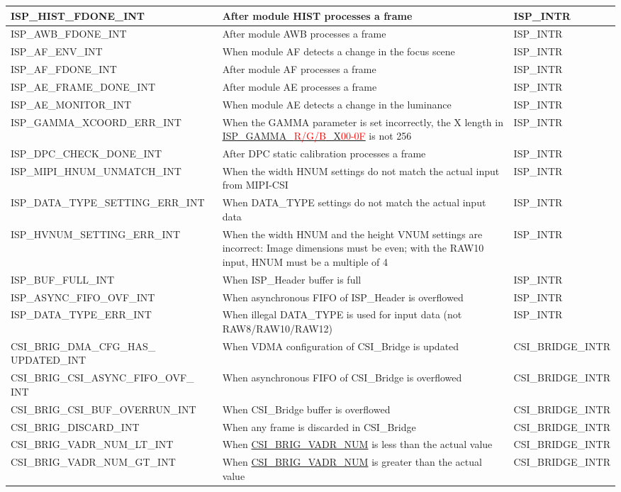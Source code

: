 \documentclass[main\_\_EN.tex]{subfiles}
\begin{document}
\begin{longtable}{ | L{5.5cm} | L{6.5cm} | L{3cm} | }
    ISP\_HIST\_FDONE\_INT & After module HIST processes a frame & ISP\_INTR \\ \hline
    ISP\_AWB\_FDONE\_INT & After module AWB processes a frame & ISP\_INTR \\ \hline
    ISP\_AF\_ENV\_INT & When module AF detects a change in the focus scene & ISP\_INTR \\ \hline
    ISP\_AF\_FDONE\_INT & After module AF processes a frame & ISP\_INTR \\ \hline
    ISP\_AE\_FRAME\_DONE\_INT & After module AE processes a frame & ISP\_INTR \\ \hline
    ISP\_AE\_MONITOR\_INT & When module AE detects a change in the luminance & ISP\_INTR \\ \hline
    ISP\_GAMMA\_XCOORD\_ERR\_INT & When the GAMMA parameter is set incorrectly, the X length in \hyperref[fielddesc:ISPGAMMARX00]{ISP\_GAMMA\_\textcolor{red}{R/G/B}\_X\textcolor{red}{00-0F}} is not 256 & ISP\_INTR \\ \hline
    ISP\_DPC\_CHECK\_DONE\_INT & After DPC static calibration processes a frame & ISP\_INTR \\ \hline
    ISP\_MIPI\_HNUM\_UNMATCH\_INT & When the width HNUM settings do not match the actual input from MIPI-CSI & ISP\_INTR \\ \hline
    ISP\_DATA\_TYPE\_SETTING\_ERR\_INT & When DATA\_TYPE settings do not match the actual input data & ISP\_INTR \\ \hline
    ISP\_HVNUM\_SETTING\_ERR\_INT & When the width HNUM and the height VNUM settings are incorrect: Image dimensions must be even; with the RAW10 input, HNUM must be a multiple of 4 & ISP\_INTR \\ \hline
    ISP\_BUF\_FULL\_INT & When ISP\_Header buffer is full & ISP\_INTR \\ \hline
    ISP\_ASYNC\_FIFO\_OVF\_INT & When asynchronous FIFO of ISP\_Header is overflowed & ISP\_INTR \\ \hline
    ISP\_DATA\_TYPE\_ERR\_INT & When illegal DATA\_TYPE is used for input data (not RAW8/RAW10/RAW12) & ISP\_INTR \\ \hline
    CSI\_BRIG\_DMA\_CFG\_HAS\_          UPDATED\_INT & When VDMA configuration of CSI\_Bridge is updated & CSI\_BRIDGE\_INTR \\\hline
    CSI\_BRIG\_CSI\_ASYNC\_FIFO\_OVF\_  INT & When asynchronous FIFO of CSI\_Bridge is overflowed & CSI\_BRIDGE\_INTR \\\hline
    CSI\_BRIG\_CSI\_BUF\_OVERRUN\_INT & When CSI\_Bridge buffer is overflowed & CSI\_BRIDGE\_INTR \\\hline
    CSI\_BRIG\_DISCARD\_INT & When any frame is discarded in CSI\_Bridge & CSI\_BRIDGE\_INTR \\\hline
    CSI\_BRIG\_VADR\_NUM\_LT\_INT & When \hyperref[fielddesc:CSIBRIGVADRNUM]{CSI\_BRIG\_VADR\_NUM} is less than the actual value & CSI\_BRIDGE\_INTR \\\hline
    CSI\_BRIG\_VADR\_NUM\_GT\_INT & When \hyperref[fielddesc:CSIBRIGVADRNUM]{CSI\_BRIG\_VADR\_NUM} is greater than the actual value & CSI\_BRIDGE\_INTR \\\hline
\end{longtable}
\end{document}
